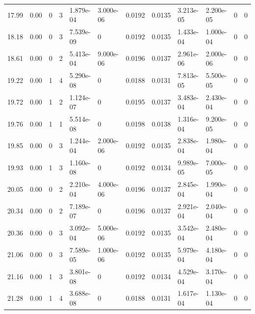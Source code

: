 \documentclass[preview]{standalone}
\begin{document}
{{{\begin{tabular}{L{1.2cm}C{1.2cm} C{0.3cm}C{0.5cm} C{1.4cm}C{1.4cm} C{1.4cm}C{1.4cm} C{1.6cm}C{1.6cm} C{1.6cm}C{1.6cm}}
  17.99  &  0.00  & 0     &  3 &  1.879e-04  & 3.000e-06  &  0.0192&   0.0135& 3.213e-05 & 2.200e-05   &  0 & 0  \\ 
  18.18  &  0.00  & 0     &  3 &  7.539e-09  & 0  &  0.0192&   0.0135& 1.433e-04 & 1.000e-04   &  0 & 0  \\ 
  18.61  &  0.00  & 0     &  2 &  5.413e-04  & 9.000e-06  &  0.0196&   0.0137& 2.961e-06 & 2.000e-06   &  0 & 0  \\ 
  19.22  &  0.00  & 1     &  4 &  5.290e-08  & 0  &  0.0188&   0.0131& 7.813e-05 & 5.500e-05   &  0 & 0  \\ 
  19.72  &  0.00  & 1     &  2 &  1.124e-07  & 0  &  0.0195&   0.0137& 3.483e-04 & 2.430e-04   &  0 & 0  \\ 
  19.76  &  0.00  & 1     &  1 &  5.514e-08  & 0  &  0.0198&   0.0138& 1.316e-04 & 9.200e-05   &  0 & 0  \\ 
  19.85  &  0.00  & 0     &  3 &  1.244e-04  & 2.000e-06  &  0.0192&   0.0135& 2.838e-04 & 1.980e-04   &  0 & 0  \\ 
  19.93  &  0.00  & 1     &  3 &  1.160e-08  & 0  &  0.0192&   0.0134& 9.989e-05 & 7.000e-05   &  0 & 0  \\ 
  20.05  &  0.00  & 0     &  2 &  2.210e-04  & 4.000e-06  &  0.0196&   0.0137& 2.845e-04 & 1.990e-04   &  0 & 0  \\ 
  20.34  &  0.00  & 0     &  2 &  7.189e-07  & 0  &  0.0196&   0.0137& 2.921e-04 & 2.040e-04   &  0 & 0  \\ 
  20.36  &  0.00  & 0     &  3 &  3.092e-04  & 5.000e-06  &  0.0192&   0.0135& 3.542e-04 & 2.480e-04   &  0 & 0  \\ 
  21.06  &  0.00  & 0     &  3 &  7.589e-05  & 1.000e-06  &  0.0192&   0.0135& 5.979e-04 & 4.180e-04   &  0 & 0  \\ 
  21.16  &  0.00  & 1     &  3 &  3.801e-08  & 0  &  0.0192&   0.0134& 4.529e-04 & 3.170e-04   &  0 & 0  \\ 
  21.28  &  0.00  & 1     &  4 &  3.688e-08  & 0  &  0.0188&   0.0131& 1.617e-04 & 1.130e-04   &  0 & 0  \\ 
\hline 
\end{tabular} 

}}}
\end{document}

